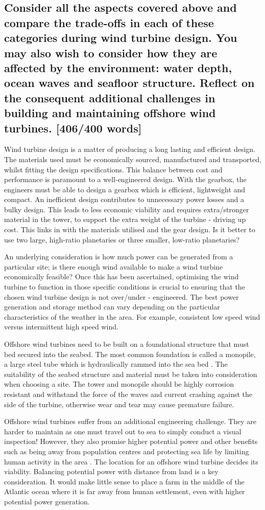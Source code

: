 \documentclass[12pt]{article}
\numberwithin{equation}{section}
\begin{document}
\begin{flushleft}
\subsection*{Consider all the aspects covered above and compare the trade-offs in each of these categories during wind turbine design. You may also wish to consider how they are affected by the environment: water depth, ocean waves and seafloor structure. Reflect on the consequent additional challenges in building and maintaining offshore wind turbines. [406/400 words]}
Wind turbine design is a matter of producing a long lasting and efficient design. The materials used must be economically sourced, manufactured and transported, whilst fitting the design specifications. This balance between cost and performance is paramount to a well-engineered design. With the gearbox, the engineers must be able to design a gearbox which is efficient, lightweight and compact. An inefficient design contributes to unnecessary power losses and a bulky design. This leads to less economic viability and requires extra/stronger material in the tower, to support the extra weight of the turbine - driving up cost. This links in with the materials utilised and the gear design. Is it better to use two large, high-ratio planetaries or three smaller, low-ratio planetaries? 

An underlying consideration is how much power can be generated from a particular site; is there enough wind available to make a wind turbine economically feasible? Once this has been ascertained, optimising the wind turbine to function in those specific conditions is crucial to ensuring that the chosen wind turbine design is not over/under - engineered. The best power generation and storage method can vary depending on the particular characteristics of the weather in the area. For example, consistent low speed wind versus intermittent high speed wind. 

Offshore wind turbines need to be built on a foundational structure that must bed secured into the seabed. The most common foundation is called a monopile, a large steel tube which is hydraulically rammed into the sea bed \citep{monopile}. The suitability of the seabed structure and material must be taken into consideration when choosing a site. The tower and monopile should be highly corrosion resistant and withstand the force of the waves and current crashing against the side of the turbine, otherwise wear and tear may cause premature failure.

Offshore wind turbines suffer from an additional engineering challenge. They are harder to maintain as one must travel out to sea to simply conduct a visual inspection! However, they also promise higher potential power and other benefits such as being away from population centres and protecting sea life by limiting human activity in the area \citep{offshorePower}. The location for an offshore wind turbine decides its viability. Balancing potential power with distance from land is a key consideration. It would make little sense to place a farm in the middle of the Atlantic ocean where it is far away from human settlement, even with higher potential power generation. 


\end{flushleft}
\end{document}
